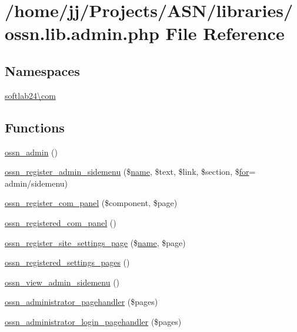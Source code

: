 \hypertarget{ossn_8lib_8admin_8php}{}\section{/home/jj/\+Projects/\+A\+S\+N/libraries/ossn.lib.\+admin.\+php File Reference}
\label{ossn_8lib_8admin_8php}
\subsection*{Namespaces}
\begin{DoxyCompactItemize}
\item 
 \hyperlink{namespacesoftlab24_1_1com}{softlab24\textbackslash{}com}
\end{DoxyCompactItemize}
\subsection*{Functions}
\begin{DoxyCompactItemize}
\item 
\hyperlink{ossn_8lib_8admin_8php_ac88341428f3012056adff9d909b8cf3b}{ossn\+\_\+admin} ()
\item 
\hyperlink{ossn_8lib_8admin_8php_ab8cf47b35ec5f755ce325e0925b06ae7}{ossn\+\_\+register\+\_\+admin\+\_\+sidemenu} (\$\hyperlink{user_8php_a765af5e9671743530143a6d3670fd9a6}{name}, \$text, \$link, \$section, \$\hyperlink{jquery-ui_8min_8js_a75bc805cf26ad48d8e8a98f5af2c3e76}{for}= \textquotesingle{}admin/sidemenu\textquotesingle{})
\item 
\hyperlink{ossn_8lib_8admin_8php_a99874e7f6d4aecaebf8bd8bd07ebc19d}{ossn\+\_\+register\+\_\+com\+\_\+panel} (\$component, \$page)
\item 
\hyperlink{ossn_8lib_8admin_8php_a87b84149d60316611a878023adecf935}{ossn\+\_\+registered\+\_\+com\+\_\+panel} ()
\item 
\hyperlink{ossn_8lib_8admin_8php_a381487ea10464f1480b74eebfdf61ce8}{ossn\+\_\+register\+\_\+site\+\_\+settings\+\_\+page} (\$\hyperlink{user_8php_a765af5e9671743530143a6d3670fd9a6}{name}, \$page)
\item 
\hyperlink{ossn_8lib_8admin_8php_a08a067e4be1807bf100027a235ce3b22}{ossn\+\_\+registered\+\_\+settings\+\_\+pages} ()
\item 
\hyperlink{ossn_8lib_8admin_8php_a6c7e211960f16c256779842a3681e269}{ossn\+\_\+view\+\_\+admin\+\_\+sidemenu} ()
\item 
\hyperlink{ossn_8lib_8admin_8php_a34dc0f51bbe418bb3aee228d3fce8fbf}{ossn\+\_\+administrator\+\_\+pagehandler} (\$pages)
\item 
\hyperlink{ossn_8lib_8admin_8php_a45405d72a40d08b40443fc958e6908af}{ossn\+\_\+administrator\+\_\+login\+\_\+pagehandler} (\$pages)
\end{DoxyCompactItemize}


